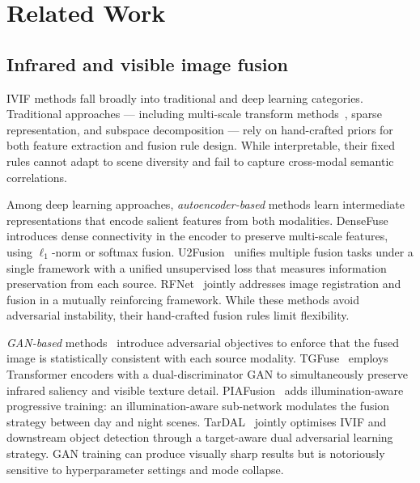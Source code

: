 \documentclass[a4paper,fleqn]{cas-dc}
\begin{document}
\section{Related Work}
\label{sec:related}

\subsection{Infrared and visible image fusion}
\label{sec:rw:ivif}

IVIF methods fall broadly into traditional and deep learning categories.
Traditional approaches --- including multi-scale transform
methods~\cite{tno2014}, sparse representation, and subspace decomposition
--- rely on hand-crafted priors for both feature extraction and fusion rule
design.  While interpretable, their fixed rules cannot adapt to scene
diversity and fail to capture cross-modal semantic correlations.

Among deep learning approaches, \emph{autoencoder-based} methods learn
intermediate representations that encode salient features from both
modalities.  DenseFuse~\cite{densefuse2019} introduces dense connectivity
in the encoder to preserve multi-scale features, using $\ell_1$-norm or
softmax fusion.  U2Fusion~\cite{u2fusion2022} unifies multiple fusion tasks
under a single framework with a unified unsupervised loss that measures
information preservation from each source.  RFNet~\cite{rfnet2023} jointly
addresses image registration and fusion in a mutually reinforcing framework.
While these methods avoid adversarial instability, their hand-crafted fusion
rules limit flexibility.

\emph{GAN-based} methods~\cite{gan2014} introduce adversarial objectives to
enforce that the fused image is statistically consistent with each source
modality.  TGFuse~\cite{tgfuse2023} employs Transformer encoders with a
dual-discriminator GAN to simultaneously preserve infrared saliency and
visible texture detail.  PIAFusion~\cite{piafusion2022} adds
illumination-aware progressive training: an illumination-aware sub-network
modulates the fusion strategy between day and night scenes.
TarDAL~\cite{tardal2022} jointly optimises IVIF and downstream object
detection through a target-aware dual adversarial learning strategy.
GAN training can produce visually sharp results but is notoriously
sensitive to hyperparameter settings and mode collapse.
\end{document}
